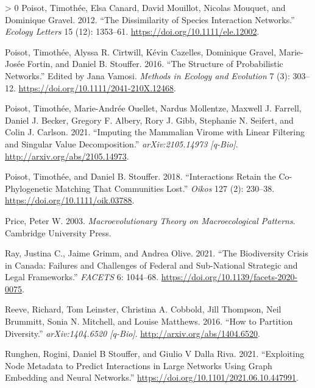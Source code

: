 \documentclass[10pt,oneside]{article}
\newlength{\cslhangindent}
\newenvironment{CSLReferences}[3] %
 {%
  \setlength{\parindent}{0pt}
  \ifodd #1 \everypar{\setlength{\hangindent}{\cslhangindent}}\ignorespaces\fi
  \ifnum #2 > 0
  \setlength{\parskip}{#2\baselineskip}
  \fi
 }%
 {}
\begin{document}
\begin{CSLReferences}{1}{0}
\leavevmode\hypertarget{ref-Poisot2012DisSpe}{}%
Poisot, Timothée, Elsa Canard, David Mouillot, Nicolas Mouquet, and
Dominique Gravel. 2012. {``The Dissimilarity of Species Interaction
Networks.''} \emph{Ecology Letters} 15 (12): 1353--61.
\url{https://doi.org/10.1111/ele.12002}.

\leavevmode\hypertarget{ref-Poisot2016StrPro}{}%
Poisot, Timothée, Alyssa R. Cirtwill, Kévin Cazelles, Dominique Gravel,
Marie-Josée Fortin, and Daniel B. Stouffer. 2016. {``The Structure of
Probabilistic Networks.''} Edited by Jana Vamosi. \emph{Methods in
Ecology and Evolution} 7 (3): 303--12.
\url{https://doi.org/10.1111/2041-210X.12468}.

\leavevmode\hypertarget{ref-Poisot2021ImpMam}{}%
Poisot, Timothée, Marie-Andrée Ouellet, Nardus Mollentze, Maxwell J.
Farrell, Daniel J. Becker, Gregory F. Albery, Rory J. Gibb, Stephanie N.
Seifert, and Colin J. Carlson. 2021. {``Imputing the Mammalian Virome
with Linear Filtering and Singular Value Decomposition.''}
\emph{arXiv:2105.14973 {[}q-Bio{]}}.
\url{http://arxiv.org/abs/2105.14973}.

\leavevmode\hypertarget{ref-Poisot2018IntRet}{}%
Poisot, Timothée, and Daniel B. Stouffer. 2018. {``Interactions Retain
the Co-Phylogenetic Matching That Communities Lost.''} \emph{Oikos} 127
(2): 230--38. \url{https://doi.org/10.1111/oik.03788}.

\leavevmode\hypertarget{ref-Price2003MacThe}{}%
Price, Peter W. 2003. \emph{Macroevolutionary Theory on Macroecological
Patterns}. Cambridge University Press.

\leavevmode\hypertarget{ref-Ray2021BioCri}{}%
Ray, Justina C., Jaime Grimm, and Andrea Olive. 2021. {``The
Biodiversity Crisis in Canada: Failures and Challenges of Federal and
Sub-National Strategic and Legal Frameworks.''} \emph{FACETS} 6:
1044--68. \url{https://doi.org/10.1139/facets-2020-0075}.

\leavevmode\hypertarget{ref-Reeve2016HowPar}{}%
Reeve, Richard, Tom Leinster, Christina A. Cobbold, Jill Thompson, Neil
Brummitt, Sonia N. Mitchell, and Louise Matthews. 2016. {``How to
Partition Diversity.''} \emph{arXiv:1404.6520 {[}q-Bio{]}}.
\url{http://arxiv.org/abs/1404.6520}.

\leavevmode\hypertarget{ref-Runghen2021ExpNod}{}%
Runghen, Rogini, Daniel B Stouffer, and Giulio V Dalla Riva. 2021.
{``Exploiting Node Metadata to Predict Interactions in Large Networks
Using Graph Embedding and Neural Networks.''}
\url{https://doi.org/10.1101/2021.06.10.447991}.


\end{CSLReferences}
\end{document}

